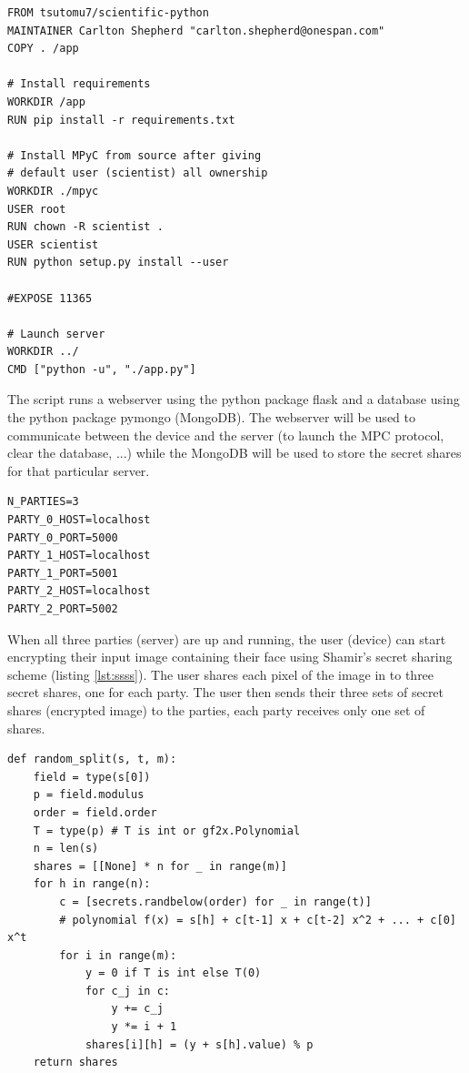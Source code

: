 \begin{lstlisting}[caption={Docker files for servers}, label={lst:docker}, frame=single]
FROM tsutomu7/scientific-python
MAINTAINER Carlton Shepherd "carlton.shepherd@onespan.com"
COPY . /app

# Install requirements
WORKDIR /app
RUN pip install -r requirements.txt

# Install MPyC from source after giving
# default user (scientist) all ownership
WORKDIR ./mpyc
USER root
RUN chown -R scientist .
USER scientist
RUN python setup.py install --user

#EXPOSE 11365

# Launch server
WORKDIR ../
CMD ["python -u", "./app.py"]
\end{lstlisting}

The  script runs a webserver using the python package flask and a database using the python package pymongo (MongoDB). The webserver will be used to communicate between the device and the server (to launch the MPC protocol, clear the database, ...) while the MongoDB will be used to store the secret shares for that particular server.

\begin{lstlisting}[caption={Environment file for servers}, label={lst:env}, frame=single]
N_PARTIES=3
PARTY_0_HOST=localhost
PARTY_0_PORT=5000
PARTY_1_HOST=localhost
PARTY_1_PORT=5001
PARTY_2_HOST=localhost
PARTY_2_PORT=5002
\end{lstlisting}

When all three parties (server) are up and running, the user (device) can start encrypting their input image containing their face using Shamir's secret sharing scheme (listing \ref{lst:ssss}). The user shares each pixel of the image in to three secret shares, one for each party. The user then sends their three sets of secret shares (encrypted image) to the parties, each party receives only one set of shares.

\begin{lstlisting}[caption={Shamir secret sharing algorithm}, label={lst:ssss}, frame=single, breaklines=true]
def random_split(s, t, m):
    field = type(s[0])
    p = field.modulus
    order = field.order
    T = type(p) # T is int or gf2x.Polynomial
    n = len(s)
    shares = [[None] * n for _ in range(m)]
    for h in range(n):
        c = [secrets.randbelow(order) for _ in range(t)]
        # polynomial f(x) = s[h] + c[t-1] x + c[t-2] x^2 + ... + c[0] x^t
        for i in range(m):
            y = 0 if T is int else T(0)
            for c_j in c:
                y += c_j
                y *= i + 1
            shares[i][h] = (y + s[h].value) % p
    return shares
\end{lstlisting}

